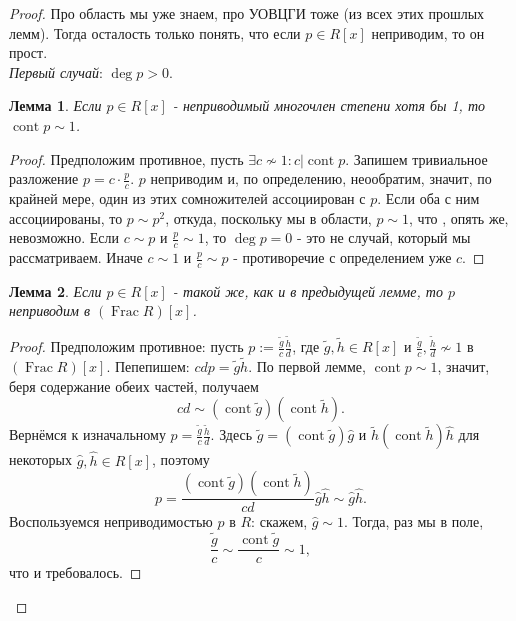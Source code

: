 \documentclass[a4paper,100pt]{article}
\theoremstyle{indented}
\newtheorem{lemma}{Лемма}
\theoremstyle{definition}
\theoremstyle{remark}
\DeclareMathOperator{\Frac}{Frac}
\DeclareMathOperator{\cont}{cont}
\begin{document}
\begin{proof}
    Про область мы уже знаем,  про УОВЦГИ тоже (из всех этих прошлых лемм). Тогда осталость только понять, что если $p\in R[x]$ неприводим, то он прост.\\

    \textit{Первый случай}: $\deg p>0$. \\

    \begin{lemma}
        Если $p\in R[x]$ - неприводимый многочлен степени хотя бы 1, то $\cont p\sim 1$.
    \end{lemma}

    \begin{proof}
        Предположим противное, пусть $\exists c\nsim 1: c\vert \cont p$. Запишем тривиальное разложение $p=c\cdot \frac{p}{c}$. $p$ неприводим и, по определению, неообратим, значит, по крайней мере, один из этих сомножителей ассоциирован с $p$. Если оба с ним ассоциированы, то $p\sim p^2$, откуда, поскольку мы в области, $p\sim 1$, что , опять же, невозможно. Если $c\sim p$ и $\frac{p}{c}\sim 1$, то $\deg p = 0$ - это не случай, который мы рассматриваем. Иначе $c\sim 1$ и $\frac{p}{c}\sim p$ - противоречие с определением уже $c$.
    \end{proof}

    \begin{lemma}
        Если $p\in R[x]$ - такой же, как и в предыдущей лемме, то $p$ неприводим в $(\Frac R)[x]$.
    \end{lemma}

    \begin{proof}
        Предположим противное: пусть $p:=\frac{\tilde{g}}{c}\frac{\tilde{h}}{d}$, где $\tilde{g}, \tilde{h}\in R[x]$ и $\frac{\tilde{g}}{c}, \frac{\tilde{h}}{d}\nsim 1$ в $(\Frac R)[x]$. Пепепишем: $cdp=\tilde{g}\tilde{h}$. По первой лемме, $\cont p\sim 1$, значит, беря содержание обеих частей, получаем 
        \[
            cd\sim (\cont \tilde{g})(\cont \tilde{h}).
        \]
        Вернёмся к изначальному $p=\frac{\tilde{g}}{c}\frac{\tilde{h}}{d}$. Здесь $\tilde{g}=(\cont \tilde{g})\hat{g}$ и $\tilde{h}(\cont \tilde{h})\hat{h}$ для некоторых $\hat{g}, \hat{h}\in R[x]$, поэтому
        \[
            p=\frac{(\cont \tilde{g})(\cont \tilde{h})}{cd}\hat{g}\hat{h}\sim \hat{g}\hat{h}.
        \]
        Воспользуемся неприводимостью $p$ в $R$: скажем, $\hat{g}\sim 1$. Тогда, раз мы в поле, 
        \[
            \frac{\tilde{g}}{c}\sim\frac{\cont \tilde{g}}{c}\sim 1, 
        \]
        что и требовалось.
    \end{proof}


\end{proof}
\end{document}
